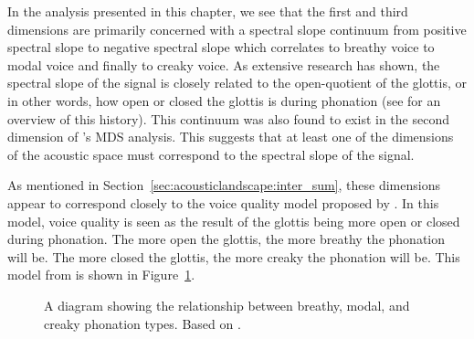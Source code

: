 In the analysis presented in this chapter, we see that the first and third dimensions are primarily concerned with a spectral slope continuum from positive spectral slope to negative spectral slope which correlates to breathy voice to modal voice and finally to creaky voice. As extensive research has shown, the spectral slope of the signal is closely related to the open-quotient of the glottis, or in other words, how open or closed the glottis is during phonation (see \citet{garellekTheoreticalAchievementsPhonetics2022} for an overview of this history). This continuum was also found to exist in the second dimension of \citeauthor{keatingCrosslanguageAcousticSpace2023}'s \citeyear{keatingCrosslanguageAcousticSpace2023} MDS analysis. This suggests that at least one of the dimensions of the acoustic space must correspond to the spectral slope of the signal. 

As mentioned in Section~\ref{sec:acousticlandscape:inter_sum}, these dimensions appear to correspond closely to the voice quality model proposed by \citet{gordonPhonationTypesCrosslinguistic2000}. In this model, voice quality is seen as the result of the glottis being more open or closed during phonation. The more open the glottis, the more breathy the phonation will be. The more closed the glottis, the more creaky the phonation will be. This model from \citet{gordonPhonationTypesCrosslinguistic2001} is shown in Figure~\ref{fig:phonation_types_1}.

\begin{figure}[h!]
    \centering
    \caption{A diagram showing the relationship between breathy, modal, and creaky phonation types. Based on \citet{gordonPhonationTypesCrosslinguistic2001}.}
    \label{fig:phonation_types_1}
\end{figure}

